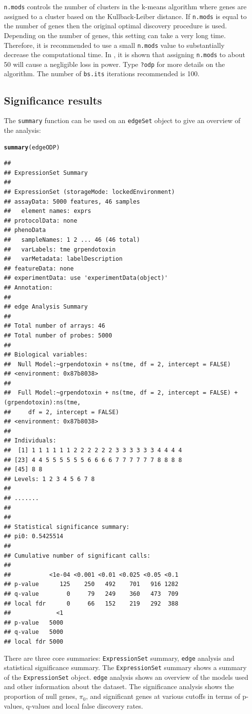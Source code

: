 \documentclass{article}\usepackage[]{graphicx}\usepackage[]{color}
\makeatletter
\newcommand{\hlstd}[1]{\textcolor[rgb]{0.345,0.345,0.345}{#1}}%
\newcommand{\hlkwd}[1]{\textcolor[rgb]{0.737,0.353,0.396}{\textbf{#1}}}%
\newenvironment{kframe}{%
 \def\at@end@of@kframe{}%
 \ifinner\ifhmode%
  \def\at@end@of@kframe{\end{minipage}}%
  \begin{minipage}{\columnwidth}%
 \fi\fi%
 \def\FrameCommand##1{\hskip\@totalleftmargin \hskip-\fboxsep
 \colorbox{shadecolor}{##1}\hskip-\fboxsep
     \hskip-\linewidth \hskip-\@totalleftmargin \hskip\columnwidth}%
 \MakeFramed {\advance\hsize-\width
   \@totalleftmargin\z@ \linewidth\hsize
   \@setminipage}}%
 {\par\unskip\endMakeFramed%
 \at@end@of@kframe}
\newenvironment{knitrout}{}{} %
\makeatother
\begin{document}
{\tt n.mods} controls the number of clusters in the k-means algorithm where genes are assigned to a cluster based on the Kullback-Leiber distance. If {\tt n.mods} is equal to the number of genes then the original optimal discovery procedure is used. Depending on the number of genes, this setting can take a very long time.  Therefore, it is recommended to use a small {\tt n.mods} value to substantially decrease the computational time. In \cite{woo:leek:storey:2011}, it is shown that assigning {\tt n.mods} to about 50 will cause a negligible loss in power. Type {\tt ?odp} for more details on the algorithm. The number of {\tt bs.its} iterations recommended is 100.

\subsection{Significance results}
The {\tt summary} function can be used on an {\tt edgeSet} object to give an overview of the analysis:
\begin{knitrout}
\color{fgcolor}\begin{kframe}
\begin{alltt}
\hlkwd{summary}\hlstd{(edgeODP)}
\end{alltt}
\begin{verbatim}
## 
## ExpressionSet Summary 
##  
## ExpressionSet (storageMode: lockedEnvironment)
## assayData: 5000 features, 46 samples 
##   element names: exprs 
## protocolData: none
## phenoData
##   sampleNames: 1 2 ... 46 (46 total)
##   varLabels: tme grpendotoxin
##   varMetadata: labelDescription
## featureData: none
## experimentData: use 'experimentData(object)'
## Annotation:  
## 
## edge Analysis Summary 
##  
## Total number of arrays: 46 
## Total number of probes: 5000 
##  
## Biological variables: 
## 	Null Model:~grpendotoxin + ns(tme, df = 2, intercept = FALSE)
## <environment: 0x87b8038>
## 
## 	Full Model:~grpendotoxin + ns(tme, df = 2, intercept = FALSE) + (grpendotoxin):ns(tme, 
##     df = 2, intercept = FALSE)
## <environment: 0x87b8038>
## 
## Individuals: 
##  [1] 1 1 1 1 1 1 2 2 2 2 2 2 3 3 3 3 3 3 4 4 4 4
## [23] 4 4 5 5 5 5 5 5 6 6 6 6 7 7 7 7 7 7 8 8 8 8
## [45] 8 8
## Levels: 1 2 3 4 5 6 7 8
## 
## ....... 
##  
## 
## Statistical significance summary:
## pi0:	0.5425514	
## 
## Cumulative number of significant calls:
## 
##           <1e-04 <0.001 <0.01 <0.025 <0.05 <0.1
## p-value      125    250   492    701   916 1282
## q-value        0     79   249    360   473  709
## local fdr      0     66   152    219   292  388
##             <1
## p-value   5000
## q-value   5000
## local fdr 5000
\end{verbatim}
\end{kframe}
\end{knitrout}
There are three core summaries: {\tt ExpressionSet} summary, {\tt edge} analysis and statistical significance summary. The {\tt ExpressionSet} summary shows a summary of the {\tt ExpressionSet} object. {\tt edge} analysis shows an overview of the models used and other information about the dataset. The significance analysis shows the proportion of null genes, $\pi_{0}$, and significant genes at various cutoffs in terms of p-values, q-values and local false discovery rates.
\end{document}
